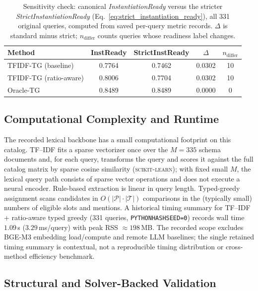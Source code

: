 \documentclass[pdflatex,sn-basic,Numbered]{sn-jnl}
\begin{document}
\begin{table}[t]
\centering
\caption{Sensitivity check: canonical \textit{InstantiationReady} versus the stricter \textit{StrictInstantiationReady} (Eq.~\eqref{eq:strict_instantiation_ready}), all 331 original queries, computed from saved per-query metric records. $\Delta$ is standard minus strict; $n_{\text{differ}}$ counts queries whose readiness label changes.}
\label{tab:strict-instready}
\small
\begin{tabular}{lcccc}
  \toprule
  Method & InstReady & StrictInstReady & $\Delta$ & $n_{\text{differ}}$ \\
  \midrule
TFIDF-TG (baseline) & 0.7764 & 0.7462 & 0.0302 & 10 \\
TFIDF-TG (ratio-aware) & 0.8006 & 0.7704 & 0.0302 & 10 \\
Oracle-TG & 0.8489 & 0.8489 & 0.0000 & 0 \\
  \bottomrule
\end{tabular}
\end{table}

\subsection{Computational Complexity and Runtime}
\label{subsec:exp_runtime}

The recorded lexical backbone has a small computational footprint on this catalog. TF--IDF fits a sparse vectorizer once over the $M=335$ schema documents and, for each query, transforms the query and scores it against the full catalog matrix by sparse cosine similarity (\textsc{scikit-learn}); with fixed small $M$, the lexical query path consists of sparse vector operations and does not execute a neural encoder. Rule-based extraction is linear in query length. Typed-greedy assignment scans candidates in $O(|\mathcal{P}|\cdot|\mathcal{T}|)$ comparisons in the (typically small) numbers of eligible slots and mentions. A historical timing summary for TF--IDF + ratio-aware typed greedy (331 queries, \texttt{PYTHONHASHSEED=0}) records wall time $1.09$\,s ($3.29$\,ms/query) with peak RSS $\approx 198$\,MB. The recorded scope excludes BGE-M3 embedding load/compute and remote LLM baselines; the single retained timing summary is contextual, not a reproducible timing distribution or cross-method efficiency benchmark.

\subsection{Structural and Solver-Backed Validation}
\label{subsec:exp_engineering}
\end{document}
